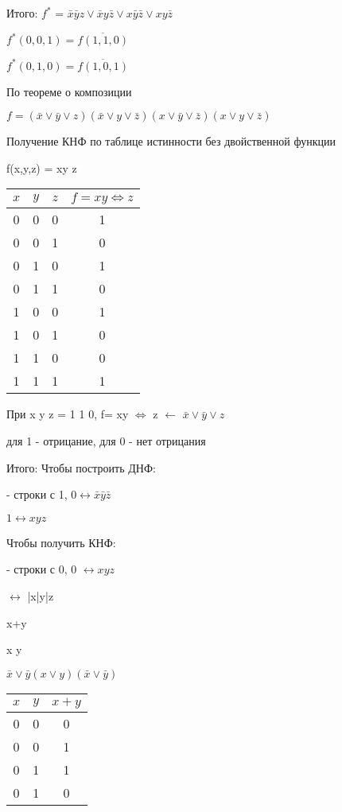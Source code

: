 \documentclass[russian]{lecture-notes}
\begin{document}
	Итого: $f^{*}$ = $\bar{x}\bar{y}z \vee \bar{x}y\bar{z} \vee x\bar{y}\bar{z} \vee xy\bar{z}$

	$f^{*}(0,0,1) = \overline{f(1,1,0)}$

	$f^{*}(0,1,0) = \overline{f(1,0,1)}$

	По теореме о композиции

	$f = (\bar{x} \vee \bar{y} \vee z)(\bar{x} \vee y \vee \bar{z})(x \vee \bar{y} \vee \bar{z})(x \vee y \vee \bar{z})$

	Получение КНФ по таблице истинности без двойственной функции

f(x,y,z) = xy \Leftrightarrow z

	\begin{table}[h!]
	\centering
	\begin{tabular}{|c|c|c|c|}
		\hline
		$x$ & $y$ & $z$ & $f = xy \Leftrightarrow z $\\ \hline
		0 & 0 & 0 	& 1  \\ \hline
		0 & 0 & 1 	& 0  \\ \hline
		0 & 1 & 0 	& 1  \\ \hline
		0 & 1 & 1 	& 0  \\ \hline
		1 & 0 & 0 	& 1  \\ \hline
		1 & 0 & 1 	& 0  \\ \hline
		1 & 1 & 0 	& 0  \\ \hline
		1 & 1 & 1 	& 1  \\ \hline
	\end{tabular}
\end{table}


		При x y z = 1 1 0, f= xy $\Leftrightarrow$ z $\leftarrow$ $\bar{x}\lor\bar{y}\lor z$

	для 1 - отрицание, для 0 - нет отрицания

	Итого: Чтобы построить ДНФ:

	- строки с 1, $0 \leftrightarrow \bar{x}\bar{y}\bar{z}$

	\qquad \qquad \qquad $1 \leftrightarrow xyz$

	Чтобы получить КНФ:

	- строки с 0, 0 $\leftrightarrow xyz$

	\qquad \qquad {} $\leftrightarrow$ \bar{x}\bar{y}\bar{z}

	\begin{example}
	x+y

	x \lor y

	$\bar{x} \lor \bar{y} (x\lor y)(\bar{x} \lor \bar{y})$

		\begin{table}[h!]
	\centering
	\begin{tabular}{|c|c|c|}
		\hline
		$x$ & $y$ & $x+y$ \\ \hline
		0 & 0 & 0 \\ \hline
		0 & 0 & 1 \\ \hline
		0 & 1 & 1 \\ \hline
		0 & 1 & 0 \\ \hline
	\end{tabular}
\end{table}

\end{example}
\end{document}
